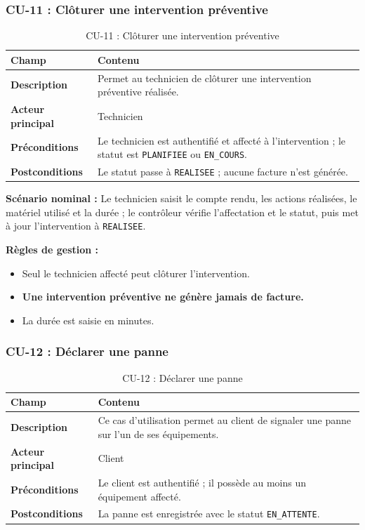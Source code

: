 \subsubsection{CU-11 : Clôturer une intervention préventive}

\begin{table}[H]
\centering
\caption{CU-11 : Clôturer une intervention préventive}
\label{tab:ch4:cu11}
\begin{tabular}{|p{3.5cm}|p{11cm}|}
\hline
\textbf{Champ} & \textbf{Contenu} \\
\hline
\textbf{Description}
  & Permet au technicien de clôturer une intervention préventive réalisée. \\
\hline
\textbf{Acteur principal}
  & Technicien \\
\hline
\textbf{Préconditions}
  & Le technicien est authentifié et affecté à l'intervention ; le statut est
    \texttt{PLANIFIEE} ou \texttt{EN\_COURS}. \\
\hline
\textbf{Postconditions}
  & Le statut passe à \texttt{REALISEE} ; aucune facture n'est générée. \\
\hline
\end{tabular}
\end{table}

\textbf{Scénario nominal :} Le technicien saisit le compte rendu, les actions réalisées, le matériel utilisé et la durée ; le contrôleur vérifie l'affectation et le statut, puis met à jour l'intervention à \texttt{REALISEE}.

\textbf{Règles de gestion :}
\begin{itemize}
    \item Seul le technicien affecté peut clôturer l'intervention.
    \item \textbf{Une intervention préventive ne génère jamais de facture.}
    \item La durée est saisie en minutes.
\end{itemize}

\subsubsection{CU-12 : Déclarer une panne}

\begin{table}[H]
\centering
\caption{CU-12 : Déclarer une panne}
\label{tab:ch4:cu12}
\begin{tabular}{|p{3.5cm}|p{11cm}|}
\hline
\textbf{Champ} & \textbf{Contenu} \\
\hline
\textbf{Description}
  & Ce cas d'utilisation permet au client de signaler une panne sur l'un de ses équipements. \\
\hline
\textbf{Acteur principal}
  & Client \\
\hline
\textbf{Préconditions}
  & Le client est authentifié ; il possède au moins un équipement affecté. \\
\hline
\textbf{Postconditions}
  & La panne est enregistrée avec le statut \texttt{EN\_ATTENTE}. \\
\hline
\end{tabular}
\end{table}

